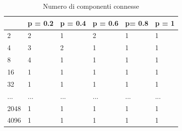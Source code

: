 \documentclass[]{article}
\begin{document}
\begin{table}[H]
\centering
\label{fig:ccs_n}
\caption{Numero di componenti connesse}
\begin{tabular}{|l|l|l|l|l|l|} 
\cline{2-6}
\multicolumn{1}{l|}{} & p = 0.2 & p = 0.4 & p = 0.6 & p= 0.8 & p = 1  \\ 
\hline
2                     & 2       & 1       & 2       & 1      & 1      \\
4                     & 3       & 2       & 1       & 1      & 1      \\
8                     & 4       & 1       & 1       & 1      & 1      \\
16                    & 1       & 1       & 1       & 1      & 1      \\
32                    & 1       & 1       & 1       & 1      & 1      \\
...                   & ...     & ...     & ...     & ...    & ...    \\
2048                  & 1       & 1       & 1       & 1      & 1      \\
4096                  & 1       & 1       & 1       & 1      & 1      \\
\hline
\end{tabular}
\end{table}
\end{document}
